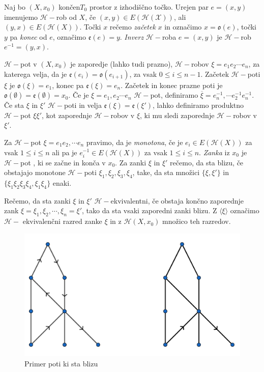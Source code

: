 \documentclass[mat1]{fmfdelo}
\DeclareRobustCommand{\h}{
    \mathcal{H}}
\DeclareRobustCommand{\pot}{
    $\h-$pot
}
\begin{document}
\begin{definicija}
    Naj bo $(X,x_0)$ končen$T_0$ prostor z izhodiščno točko. Urejen par 
$e=(x,y)$ imenujemo $\mathcal{H}-$rob od $X$, če $(x,y)\in 
E(\mathcal{H}(\mathcal{X}))$, ali $(y,x)\in 
E(\h(X))$. Točki $x$ rečemo \textit{začetek} $x$ in označimo 
$x=\mathfrak{o}(e)$, točki $y$ pa \textit{konec} od $e$, 
označimo $\mathfrak{e}(e)=y$. \textit{Inverz} $\h-$roba $e=(x,y)$ je $\h-$rob $e^{-1}=(y,x)$.

$\h-$pot v $(X,x_0)$ je zaporedje (lahko tudi prazno), $\h-$robov $\xi=e_1e_2\cdots e_n$, 
za katerega velja, da je $\mathfrak{e}(e_i)=\mathfrak{o}(e_{i+1})$, za vsak $0\leq i \leq n-1$.
 Začetek $\h-$poti $\xi$ je  $\mathfrak{o}(\xi)=e_1$, konec pa $\mathfrak{e}(\xi)=e_n$.
 Začetek in konec prazne poti je $\mathfrak{o}(\emptyset)=\mathfrak{e}(\emptyset)=x_0$.
 Če je $\xi=e_1,e_2\cdots e_n$ $\h-$pot, definiramo $\overline{\xi}=e_n^{-1},\cdots 
 e_2^{-1}e_n^{-1}$. Če sta $\xi$ in $\xi'$ $\h-$poti in velja $\mathfrak{e}(\xi)=
 \mathfrak{e}(\xi')$, lahko definiramo produktno \pot $\xi\xi'$, kot zaporednje 
 $\h-$robov v $\xi$, ki mu sledi zaporednje $\h-$robov v $\xi'$.

 Za \pot $\xi=e_1e_2,\cdots e_n$ pravimo, da je \textit{monotona}, če je $e_i\in 
 E(\h(X))$ za vsak $1\leq i \leq n$ ali pa je $e_i^{-1}\in E(\h(X))$ za vsak $1\leq i \leq n$.
 \textit{Zanka} iz $x_0$ je \pot, ki se začne in konča v $x_0$. Za zanki $\xi$ in
  $\xi'$ rečemo, da sta blizu, če obstajajo monotone $\h-$poti $\xi_1,\xi_2,\xi_3,\xi_4$,
   take, da  sta množici $\{\xi,\xi'\}$ in $\{\xi_1\xi_2\xi_3\xi_4,\xi_1\xi_4\}$ enaki.

   Rečemo, da sta zanki $\xi$ in $\xi'$ $\h-$ekvivalentni, če obstaja končno zaporednje zank $\xi=\xi_1,\xi_2, \cdots ,\xi_n=\xi'$, tako da sta vsaki zaporedni zanki blizu. Z $\langle\xi\rangle$ označimo $\h-$ ekvivalenčni razred zanke $\xi$ in z $\mathscr{H}(X,x_0)$ množico teh razredov.
\end{definicija}

\begin{figure}[h!]
    \centering
    \includegraphics[width=0.6\linewidth]{poti.png}
  \caption{Primer poti ki sta blizu}
  \end{figure}
\end{document}
